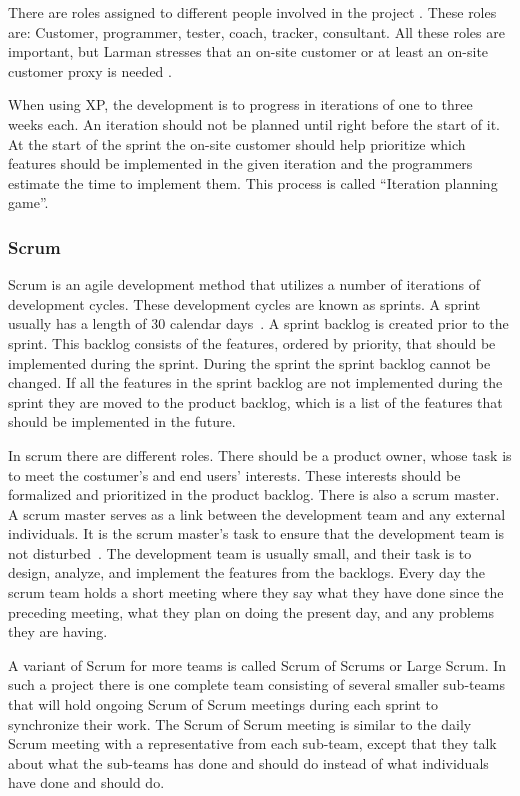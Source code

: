 There are roles assigned to different people involved in the project \cite[p.~145]{Larman04}.
These roles are: Customer, programmer, tester, coach, tracker, consultant.
All these roles are important, but Larman stresses that an on-site customer or at least an on-site customer proxy is needed \cite[p.~152-156]{Larman04}.

When using XP, the development is to progress in iterations of one to three weeks each.
An iteration should not be planned until right before the start of it.
At the start of the sprint the on-site customer should help prioritize which features should be implemented in the given iteration and the programmers estimate the time to implement them.
This process is called ``Iteration planning game''.

\subsubsection{Scrum}
\label{par:scrum}
Scrum is an agile development method that utilizes a number of iterations of development cycles.
These development cycles are known as sprints.
A sprint usually has a length of 30 calendar days~\cite{Larman04}.
A sprint backlog is created prior to the sprint. 
This backlog consists of the features, ordered by priority, that should be implemented during the sprint.
During the sprint the sprint backlog cannot be changed.
If all the features in the sprint backlog are not implemented during the sprint they are moved to the product backlog, which is a list of the features that should be implemented in the future.

In scrum there are different roles. 
There should be a product owner, whose task is to meet the costumer's and end users' interests. 
These interests should be formalized and prioritized in the product backlog.
There is also a scrum master. 
A scrum master serves as a link between the development team and any external individuals.
It is the scrum master's task to ensure that the development team is not disturbed~\cite{Larman04}.
The development team is usually small, and their task is to design, analyze, and implement the features from the backlogs.
Every day the scrum team holds a short meeting where they say what they have done since the preceding meeting, what they plan on doing the present day, and any problems they are having.

A variant of Scrum for more teams is called Scrum of Scrums or Large Scrum.
In such a project there is one complete team consisting of several smaller sub-teams that will hold ongoing Scrum of Scrum meetings during each sprint to synchronize their work.
The Scrum of Scrum meeting is similar to the daily Scrum meeting with a representative from each sub-team, except that they talk about what the sub-teams has done and should do instead of what individuals have done and should do.

